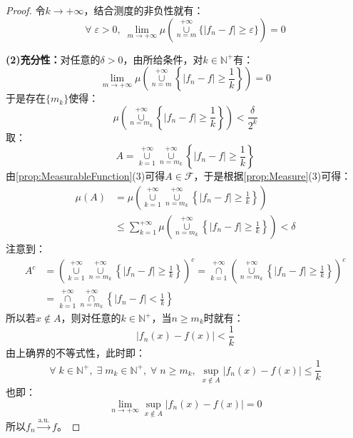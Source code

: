 \begin{proof}
	令$k\to+\infty$，结合测度的非负性就有：
	\begin{equation*}
		\forall\;\varepsilon>0,\;\lim_{m\to+\infty}\mu\left(\underset{n=m}{\overset{+\infty}{\cup}}\{|f_n-f|\geqslant\varepsilon\}\right)=0
	\end{equation*}\par
	\textbf{(2)充分性：}对任意的$\delta>0$，由所给条件，对$k\in\mathbb{N}^+$有：
	\begin{equation*}
		\lim_{m\to+\infty}\mu\left(\underset{n=m}{\overset{+\infty}{\cup}}\left\{|f_n-f|\geqslant\frac{1}{k}\right\}\right)=0	
	\end{equation*}
	于是存在$\{m_k\}$使得：
	\begin{equation*}
		\mu\left(\underset{n=m_k}{\overset{+\infty}{\cup}}\left\{|f_n-f|\geqslant\frac{1}{k}\right\}\right)<\frac{\delta}{2^k}
	\end{equation*}
	取：
	\begin{equation*}
		A=\underset{k=1}{\overset{+\infty}{\cup}}\underset{n=m_k}{\overset{+\infty}{\cup}}\left\{|f_n-f|\geqslant\frac{1}{k}\right\}
	\end{equation*}
	由\cref{prop:MeasurableFunction}(3)可得$A\in \mathscr{F}$，于是根据\cref{prop:Measure}(3)可得：
	\begin{align*}
		\mu(A)&=\mu\left(\underset{k=1}{\overset{+\infty}{\cup}}\underset{n=m_k}{\overset{+\infty}{\cup}}\left\{|f_n-f|\geqslant\frac{1}{k}\right\}\right) \\
		&\leqslant\sum_{k=1}^{+\infty}\mu\left(\underset{n=m_k}{\overset{+\infty}{\cup}}\left\{|f_n-f|\geqslant\frac{1}{k}\right\}\right)<\delta
	\end{align*}
	注意到：
	\begin{align*}
		A^c&=\left(\underset{k=1}{\overset{+\infty}{\cup}}\underset{n=m_k}{\overset{+\infty}{\cup}}\left\{|f_n-f|\geqslant\frac{1}{k}\right\}\right)^c=\underset{k=1}{\overset{+\infty}{\cap}}\left(\underset{n=m_k}{\overset{+\infty}{\cup}}\left\{|f_n-f|\geqslant\frac{1}{k}\right\}\right)^c \\
		&=\underset{k=1}{\overset{+\infty}{\cap}}\underset{n=m_k}{\overset{+\infty}{\cap}}\left\{|f_n-f|<\frac{1}{k}\right\}
	\end{align*}
	所以若$x\notin A$，则对任意的$k\in \mathbb{N}^+$，当$n\geqslant m_k$时就有：
	\begin{equation*}
		|f_n(x)-f(x)|<\frac{1}{k}
	\end{equation*}
	由上确界的不等式性，此时即：
	\begin{equation*}
		\forall\;k\in\mathbb{N}^+,\;\exists\;m_k\in\mathbb{N}^+,\;\forall\;n\geqslant m_k,\;\sup_{x\notin A}|f_n(x)-f(x)|\leqslant\frac{1}{k}
	\end{equation*}
	也即：
	\begin{equation*}
		\lim_{n\to+\infty}\sup_{x\notin A}|f_n(x)-f(x)|=0
	\end{equation*}
	所以$f_n\overset{\text{a.u.}}{\longrightarrow}f$。
\end{proof}
